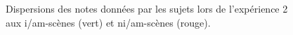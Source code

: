 \documentclass[twoside,twocolumn]{article}
\begin{document}
\begin{figure}[h]
        \caption{Dispersions des notes données par les sujets lors de l'expérience 2 aux i/am-scènes (vert) et ni/am-scènes (rouge).}\label{fig:xp4_note_1}
\end{figure}
\end{document}
